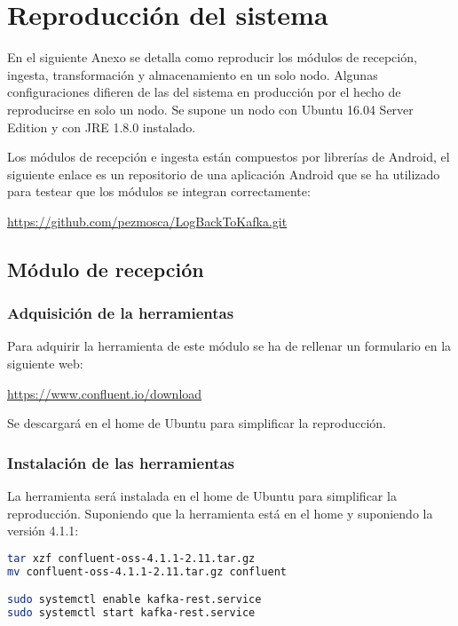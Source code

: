 \chapter{Reproducción del sistema}

En el siguiente Anexo se detalla como reproducir los módulos de recepción, ingesta, transformación y almacenamiento en un solo nodo. Algunas configuraciones difieren de las del sistema en producción por el hecho de reproducirse en solo un nodo. Se supone un nodo con Ubuntu 16.04 Server Edition y con JRE 1.8.0 instalado.

Los módulos de recepción e ingesta están compuestos por librerías de Android, el siguiente enlace es un repositorio de una aplicación Android que se ha utilizado para testear que los módulos se integran correctamente:

\href{https://github.com/pezmosca/LogBackToKafka.git}{https://github.com/pezmosca/LogBackToKafka.git}

\section{Módulo de recepción}
\subsection{Adquisición de la herramientas}
Para adquirir la herramienta de este módulo se ha de rellenar un formulario en la siguiente web:

\href{https://www.confluent.io/download/}{https://www.confluent.io/download}

Se descargará en el home de Ubuntu para simplificar la reproducción.

\subsection{Instalación de las herramientas}
La herramienta será instalada en el home de Ubuntu para simplificar la reproducción. Suponiendo que la herramienta está en el home y suponiendo la versión 4.1.1:

\begin{lstlisting}[language=Bash]
tar xzf confluent-oss-4.1.1-2.11.tar.gz
mv confluent-oss-4.1.1-2.11.tar.gz confluent

sudo systemctl enable kafka-rest.service
sudo systemctl start kafka-rest.service
\end{lstlisting}

